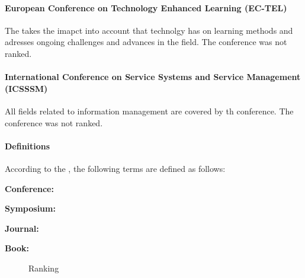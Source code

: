 \paragraph{European Conference on Technology Enhanced Learning (EC-TEL)}
The  takes the imapct into account that technolgy has on learning methods and adresses ongoing challenges and advances in the field.
The conference was not ranked.
\paragraph{International Conference on Service Systems and Service Management (ICSSSM)} All fields related to information management are covered by th  conference. The conference was not ranked.
\paragraph{Definitions} According to the , the following terms are defined as follows:
\begin{displayquote}
\textbf{Conference: }
\end{displayquote}
\begin{displayquote}
\textbf{Symposium: }
\end{displayquote}
\begin{displayquote}
\textbf{Journal: }
\end{displayquote}
\begin{displayquote}
\textbf{Book: }
\end{displayquote}

\begin{figure}[!ht]
	\centering
	\caption{Ranking} \label{graph:rq3_publication_channel_1}
\end{figure}

